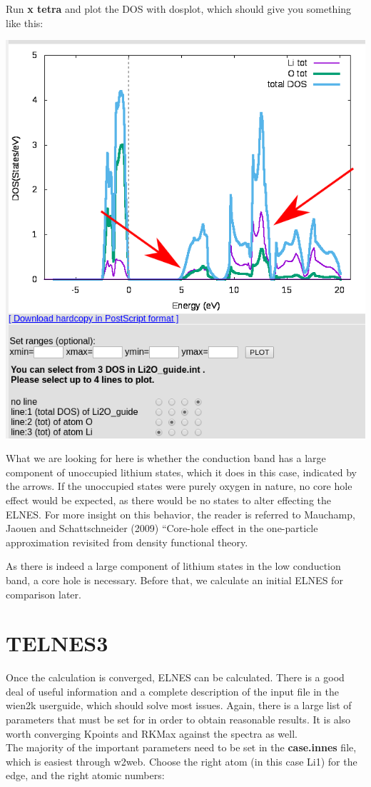 \documentclass[12pt]{article}
\begin{document}
Run \textbf{x tetra} and plot the DOS with dosplot, which should give you something like this: 


\includegraphics[scale=0.4]{./images/Li2O_dos.png}

What we are looking for here is whether the conduction band has a large component of unoccupied lithium states, which it does in this case, indicated by the arrows.  If the unoccupied states were purely oxygen in nature, no core hole effect would be expected, as there would be no states to alter effecting the ELNES.  For more insight on this behavior, the reader is referred to Mauchamp, Jaouen and Schattschneider (2009) ``Core-hole effect in the one-particle approximation revisited from density functional theory.

As there is indeed a large component of lithium states in the low conduction band, a core hole is necessary. Before that, we calculate an initial ELNES for comparison later.  


\section{TELNES3}

Once the calculation is converged, ELNES can be calculated.  There is a good deal of useful information and a complete description of the input file in the wien2k userguide, which should solve most issues. Again, there is a large list of parameters that must be set for in order to obtain reasonable results. It is also worth converging Kpoints and RKMax against the spectra as well.\\
The majority of the important parameters need to be set in the \textbf{case.innes} file, which is easiest through w2web.  Choose the right atom (in this case Li1) for the edge, and the right atomic numbers:  
\end{document}

